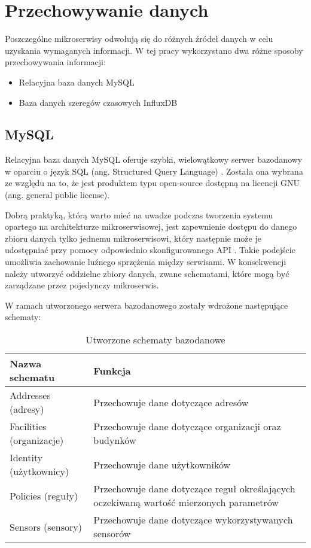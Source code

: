 \newpage
\section{Przechowywanie danych}

Poszczególne mikroserwisy odwołują się do różnych źródeł danych w celu uzyskania 
wymaganych informacji. W tej pracy wykorzystano dwa różne sposoby przechowywania 
informacji:

\begin{itemize} %
    \item Relacyjna baza danych MySQL
    \item Baza danych szeregów czasowych InfluxDB
\end{itemize}

\subsection{MySQL}

Relacyjna baza danych MySQL oferuje szybki, wielowątkowy serwer bazodanowy w oparciu 
o język SQL (ang. Structured Query Language)
\cite{mysql2022}. Została ona wybrana ze względu na to, że 
jest produktem typu open-source dostępną na licencji GNU (ang. general public license). 

Dobrą praktyką, którą warto mieć na uwadze podczas tworzenia systemu opartego na 
architekturze mikroserwisowej, jest zapewnienie dostępu do danego zbioru danych tylko 
jednemu mikroserwisowi, który następnie może je udostępniać przy pomocy odpowiednio 
skonfigurowanego API \cite{richardson2021}. Takie podejście umożliwia zachowanie luźnego 
sprzężenia między serwisami. W konsekwencji należy utworzyć oddzielne zbiory 
danych, zwane schematami, które mogą być zarządzane przez pojedynczy mikroserwis.

W ramach utworzonego serwera bazodanowego zostały wdrożone następujące schematy:

    \begin{xltabular}{1\textwidth} { 
        | >{\raggedright\arraybackslash}X        
        | >{\raggedright\arraybackslash}X | }
        \caption{Utworzone schematy bazodanowe} \label{tab:schematy-bazodanowe} \\
        \hline
       Nazwa schematu & Funkcja \\
       \hline
       Addresses (adresy) & 
       Przechowuje dane dotyczące adresów \\
       \hline
       Facilities (organizacje) &
       Przechowuje dane dotyczące organizacji oraz budynków \\
       \hline
       Identity (użytkownicy) &
       Przechowuje dane użytkowników \\
       \hline
       Policies (reguły) &
       Przechowuje dane dotyczące reguł określających oczekiwaną wartość mierzonych 
       parametrów \\
       \hline
       Sensors (sensory) & 
       Przechowuje dane dotyczące wykorzystywanych sensorów \\
       \hline
    \end{xltabular}

